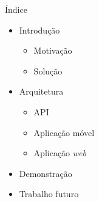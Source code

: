\begin{frame}{Índice}
\vspace*{-7em}
\begin{itemize}
	\item Introdução
	\begin{itemize}
		\item Motivação
		\item Solução
	\end{itemize}
	
	\item Arquitetura
	\begin{itemize}
		\item API
		\item Aplicação móvel
		\item Aplicação \textit{web}
	\end{itemize}
	
	\item Demonstração
	
	\item Trabalho futuro
\end{itemize}
\end{frame}